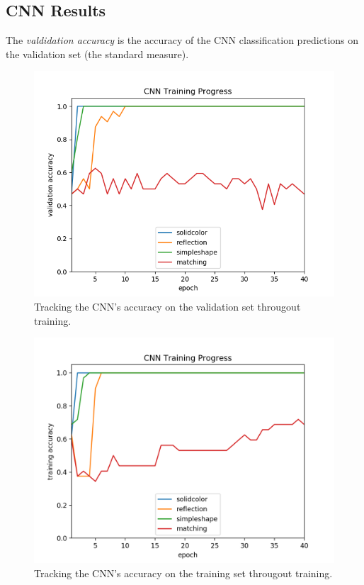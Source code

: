 \documentclass{article}
\renewcommand{\it}{\textit}
\begin{document}
\subsection{CNN Results}

The \it{valdidation accuracy} is the accuracy of the CNN classification predictions on the validation set (the standard measure).

\begin{figure}[ht]
\label{fig:cnn-validation-results}
\centering
\includegraphics[width=\textwidth]{cnn-validation-results.png}
\caption{Tracking the CNN's accuracy on the validation set througout training.}
\end{figure}

\begin{figure}[ht]
\label{fig:cnn-training-results}
\centering
\includegraphics[width=\textwidth]{cnn-training-results.png}
\caption{Tracking the CNN's accuracy on the training set througout training.}
\end{figure}
\end{document}

